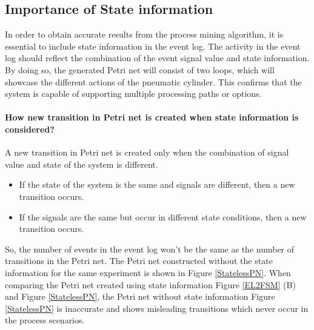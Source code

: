 \begin{bibunit}

\subsection{Importance of State information}

In order to obtain accurate results from the process mining algorithm, it is essential to include state information in the event log. The activity in the event log should reflect the combination of the event signal value and state information. By doing so, the generated Petri net will consist of two loops, which will showcase the different actions of the pneumatic cylinder. This confirms that the system is capable of supporting multiple processing paths or options.

\paragraph{How new transition in Petri net is created when state information is considered?}

A new transition in Petri net is created only when the combination of signal value and state of the system is different. 

\begin{itemize}
  \item If the state of the system is the same and signals are different, then a new transition occurs.
  \item If the signals are the same but  occur 
  in different state conditions, then  a new transition occurs.
\end{itemize}

So, the number of events in the event log won't be the same as the number of transitions in the Petri net. The Petri net constructed without the state information for the same experiment is shown in  Figure \ref{StatelessPN}. When comparing the Petri net created using state information Figure \ref{EL2FSM} (B) and Figure \ref{StatelessPN}, the Petri net without state information Figure  \ref{StatelessPN} is inaccurate and shows misleading transitions which never occur in the process scenarios.


\end{bibunit}

